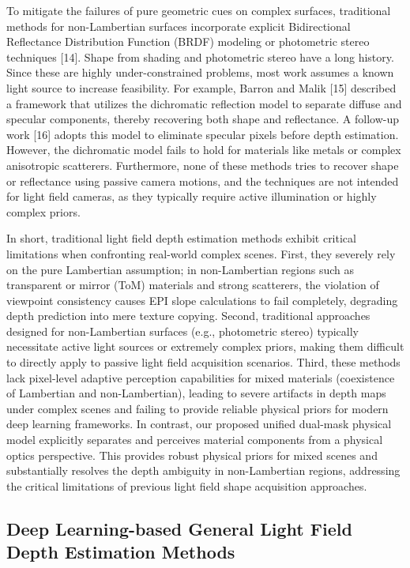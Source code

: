 To mitigate the failures of pure geometric cues on complex surfaces, traditional methods for non-Lambertian surfaces incorporate explicit Bidirectional Reflectance Distribution Function (BRDF) modeling or photometric stereo techniques [14]. Shape from shading and photometric stereo have a long history. Since these are highly under-constrained problems, most work assumes a known light source to increase feasibility. For example, Barron and Malik [15] described a framework that utilizes the dichromatic reflection model to separate diffuse and specular components, thereby recovering both shape and reflectance. A follow-up work [16] adopts this model to eliminate specular pixels before depth estimation. However, the dichromatic model fails to hold for materials like metals or complex anisotropic scatterers. Furthermore, none of these methods tries to recover shape or reflectance using passive camera motions, and the techniques are not intended for light field cameras, as they typically require active illumination or highly complex priors.

In short, traditional light field depth estimation methods exhibit critical limitations when confronting real-world complex scenes. First, they severely rely on the pure Lambertian assumption; in non-Lambertian regions such as transparent or mirror (ToM) materials and strong scatterers, the violation of viewpoint consistency causes EPI slope calculations to fail completely, degrading depth prediction into mere texture copying. Second, traditional approaches designed for non-Lambertian surfaces (e.g., photometric stereo) typically necessitate active light sources or extremely complex priors, making them difficult to directly apply to passive light field acquisition scenarios. Third, these methods lack pixel-level adaptive perception capabilities for mixed materials (coexistence of Lambertian and non-Lambertian), leading to severe artifacts in depth maps under complex scenes and failing to provide reliable physical priors for modern deep learning frameworks. In contrast, our proposed unified dual-mask physical model explicitly separates and perceives material components from a physical optics perspective. This provides robust physical priors for mixed scenes and substantially resolves the depth ambiguity in non-Lambertian regions, addressing the critical limitations of previous light field shape acquisition approaches.

\subsection{Deep Learning-based General Light Field Depth Estimation Methods}

